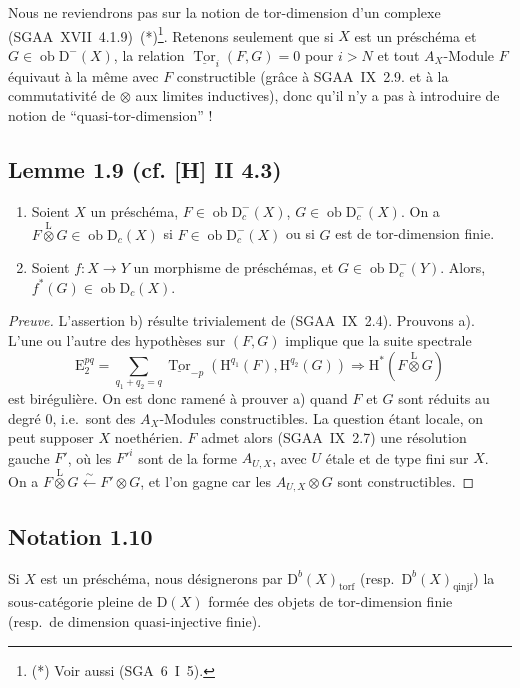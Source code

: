 \documentclass[11pt]{article}
\renewcommand{\H}{\mathrm{H}}
\DeclareMathOperator{\Tor}{Tor}
\newcommand{\D}{\mathrm{D}}
\newcommand{\E}{\mathrm{E}}
\newcommand{\ob}{\operatorname{ob}}
\providecommand{\ob}{\operatorname{ob}}
\begin{document}
Nous ne reviendrons pas sur la notion de tor-dimension d'un complexe (SGAA~XVII~4.1.9)~(*)\footnote{(*) Voir aussi (SGA~6~I~5).}. Retenons seulement que si $X$ est un préschéma et $G \in \ob \D^{-}(X)$, la relation $\underline{\Tor}_i(F,G) = 0$ pour $i > N$ et tout $A_X$-Module $F$ équivaut à la même avec $F$ constructible (grâce à SGAA~IX~2.9. et à la commutativité de $\otimes$ aux limites inductives), donc qu'il n'y a pas à introduire de notion de ``quasi-tor-dimension'' !

\subsection*{Lemme 1.9 (cf. [H] II 4.3)}
\begin{enumerate}
\item[a)] Soient $X$ un préschéma, $F \in \ob \D_c^{-}(X)$, $G \in \ob \D_c^{-}(X)$. On a $F \mathop{\otimes}\limits^{\mathrm{L}} G \in \ob \D_c(X)$ si $F \in \ob \D_c^{-}(X)$ ou si $G$ est de tor-dimension finie.
\item[b)] Soient $f : X \to Y$ un morphisme de préschémas, et $G \in \ob \D_c^{-}(Y)$. Alors, $f^{*}(G) \in \ob \D_c(X)$.
\end{enumerate}

\begin{proof}[Preuve]
L'assertion b) résulte trivialement de (SGAA~IX~2.4). Prouvons a). L'une ou l'autre des hypothèses sur $(F,G)$ implique que la suite spectrale
\[
\E_2^{pq} = \sum_{q_1+q_2=q} \underline{\Tor}_{-p}(\H^{q_1}(F), \H^{q_2}(G)) \Rightarrow \H^{*}(F \mathop{\otimes}\limits^{\mathrm{L}} G)
\]
est birégulière. On est donc ramené à prouver a) quand $F$ et $G$ sont réduits au degré $0$, i.e.~sont des $A_X$-Modules constructibles. La question étant locale, on peut supposer $X$ noethérien. $F$ admet alors (SGAA~IX~2.7) une résolution gauche $F'$, où les $F'^i$ sont de la forme $A_{U,X}$, avec $U$ étale et de type fini sur $X$. On a $F \mathop{\otimes}\limits^{\mathrm{L}} G \xleftarrow{\sim} F' \otimes G$, et l'on gagne car les $A_{U,X} \otimes G$ sont constructibles.
\end{proof}

\subsection*{Notation 1.10}
Si $X$ est un préschéma, nous désignerons par $\D^{b}(X)_{\mathrm{torf}}$ (resp.~$\D^{b}(X)_{\mathrm{qinjf}}$) la sous-catégorie pleine de $\D(X)$ formée des objets de tor-dimension finie (resp.~de dimension quasi-injective finie).
\end{document}
